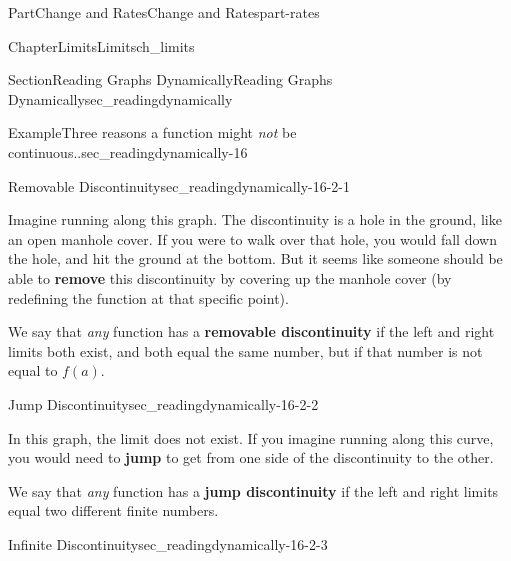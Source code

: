 \documentclass{tufte-book}
\newcommand{\terminology}[1]{\textbf{#1}}
\numberwithin{equation}{chapter}
\begin{document}
\begin{partptx}{Part}{Change and Rates}{}{Change and Rates}{}{}{part-rates}
\begin{chapterptx}{Chapter}{Limits}{}{Limits}{}{}{ch_limits}
\begin{sectionptx}{Section}{Reading Graphs Dynamically}{}{Reading Graphs Dynamically}{}{}{sec_readingdynamically}
\begin{example}{Example}{Three reasons  a function might \emph{not} be continuous..}{sec_readingdynamically-16}%
%
\begin{descriptionlist}
\begin{dlimedium}{Removable Discontinuity}{sec_readingdynamically-16-2-1}%
\begin{image}{0.25}{0.5}{0.25}{}%
%
\end{image}%
 Imagine running along this graph. The discontinuity is a hole in the ground, like an open manhole cover. If you were to walk over that hole, you would fall down the hole, and hit the ground at the bottom. But it seems like someone should be able to \terminology{remove} this discontinuity by covering up the manhole cover (by redefining the function at that specific point).%
\par
We say that \emph{any} function has a \terminology{removable discontinuity} if the left and right limits both exist, and both equal the same number, but if that number is not equal to \(f(a)\).%
\end{dlimedium}%
\begin{dlimedium}{Jump Discontinuity}{sec_readingdynamically-16-2-2}%
\begin{image}{0.25}{0.5}{0.25}{}%
%
\end{image}%
 In this graph, the limit does not exist.  If you imagine running along this curve, you would need to \terminology{jump} to get from one side of the discontinuity to the other.%
\par
We say that \emph{any} function has a \terminology{jump discontinuity} if the left and right limits equal two different finite numbers.%
\end{dlimedium}%
\begin{dlimedium}{Infinite Discontinuity}{sec_readingdynamically-16-2-3}%

\end{dlimedium}
\end{descriptionlist}
\end{example}
\end{sectionptx}
\end{chapterptx}
\end{partptx}
\end{document}
